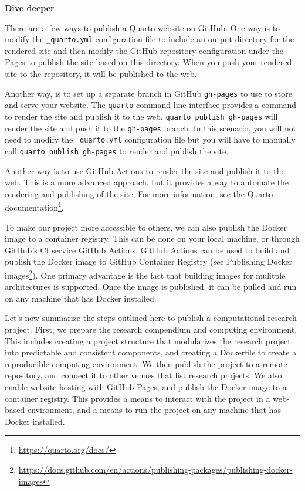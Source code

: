 \documentclass[
  letterpaper,
]{latex/krantz}
\theoremstyle{definition}
\theoremstyle{remark}
\DeclareRobustCommand{\href}[2]{#2\footnote{\url{#1}}}
\begin{document}
\begin{tcolorbox}[enhanced jigsaw, colframe=quarto-callout-color-frame, breakable, bottomrule=.15mm, arc=.35mm, left=2mm, opacityback=0, rightrule=.15mm, colback=white, toprule=.15mm, leftrule=.75mm]

\textbf{ Dive deeper}

There are a few ways to publish a Quarto website on GitHub. One way is
to modify the \texttt{\_quarto.yml} configuration file to include an
output directory for the rendered site and then modify the GitHub
repository configuration under the Pages to publish the site based on
this directory. When you push your rendered site to the repository, it
will be published to the web.

Another way, is to set up a separate branch in GitHub \texttt{gh-pages}
to use to store and serve your website. The \texttt{quarto} command line
interface provides a command to render the site and publish it to the
web. \texttt{quarto\ publish\ gh-pages} will render the site and push it
to the \texttt{gh-pages} branch. In this scenario, you will not need to
modify the \texttt{\_quarto.yml} configuration file but you will have to
manually call \texttt{quarto\ publish\ gh-pages} to render and publish
the site.

Another way is to use GitHub Actions to render the site and publish it
to the web. This is a more advanced approach, but it provides a way to
automate the rendering and publishing of the site. For more information,
see the \href{https://quarto.org/docs/}{Quarto documentation}.

\end{tcolorbox}

To make our project more accessible to others, we can also publish the
Docker image to a container registry. This can be done on your local
machine, or through GitHub's CI service GitHub Actions. GitHub Actions
can be used to build and publish the Docker image to GitHub Container
Registry (see
\href{https://docs.github.com/en/actions/publishing-packages/publishing-docker-images}{Publishing
Docker images}). One primary advantage is the fact that building images
for mulitple architectures is supported. Once the image is published, it
can be pulled and run on any machine that has Docker installed.

Let's now summarize the steps outlined here to publish a computational
research project. First, we prepare the research compendium and
computing environment. This includes creating a project structure that
modularizes the research project into predictable and consistent
components, and creating a Dockerfile to create a reproducible computing
environment. We then publish the project to a remote repository, and
connect it to other venues that list research projects. We also enable
website hosting with GitHub Pages, and publish the Docker image to a
container registry. This provides a means to interact with the project
in a web-based environment, and a means to run the project on any
machine that has Docker installed.
\end{document}
